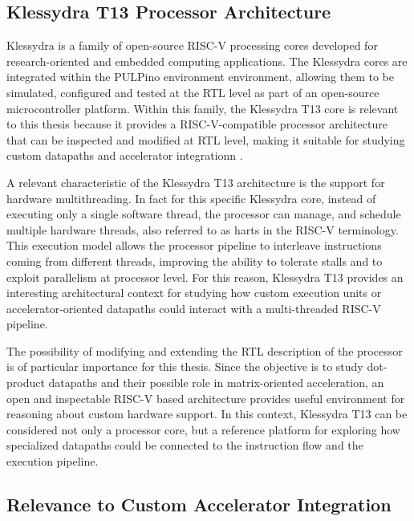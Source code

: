\subsection{Klessydra T13 Processor Architecture}

Klessydra is a family of open-source RISC-V processing cores developed for research-oriented and embedded computing applications. The Klessydra cores are integrated within the PULPino environment environment, allowing them to be simulated, configured and tested at the RTL level as part of an open-source microcontroller platform. Within this family, the Klessydra T13 core is relevant to this thesis because it provides a RISC-V-compatible processor architecture that can be inspected and modified at RTL level, making it suitable for studying custom datapaths and accelerator integrationn \cite{klessydraPulpinoGithub}.

A relevant characteristic of the Klessydra T13 architecture is the support for hardware multithreading. In fact for this specific Klessydra core,  instead of executing only a single software thread, the processor can manage, and schedule multiple hardware threads, also referred to as harts in the RISC-V terminology. This execution model allows the processor pipeline to interleave instructions coming from different threads, improving the ability to tolerate stalls and to exploit parallelism at processor level. 
For this reason, Klessydra T13 provides an interesting architectural context for studying how custom execution units or accelerator-oriented datapaths could interact with a multi-threaded RISC-V pipeline. 

The possibility of modifying and extending the RTL description of the processor is of particular importance for this thesis. Since the objective is to study dot-product datapaths and their possible role in matrix-oriented acceleration, an open and inspectable RISC-V based architecture provides useful environment for reasoning about custom hardware support. In this context, Klessydra T13 can be considered not only a processor core, but a reference platform for exploring how specialized datapaths could be connected to the instruction flow and the execution pipeline.

\subsection{Relevance to Custom Accelerator Integration}

